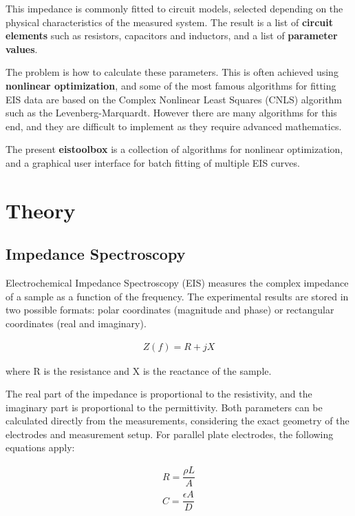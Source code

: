 \documentclass[10pt,a4paper,oneside]{book}
\begin{document}
This impedance is commonly fitted to circuit models, selected depending on the physical characteristics of the measured system. The result is a list of \textbf{circuit elements} such as resistors, capacitors and inductors, and a list of \textbf{parameter values}.

The problem is how to calculate these parameters. This is often achieved using \textbf{nonlinear optimization}, and some of the most famous algorithms for fitting EIS data are based on the Complex Nonlinear Least Squares (CNLS) algorithm such as the Levenberg-Marquardt. However there are many algorithms for this end, and they are difficult to implement as they require advanced mathematics.

The present \textbf{eistoolbox} is a collection of algorithms for nonlinear optimization, and a graphical user interface for batch fitting of multiple EIS curves.

\chapter{Theory}


\section{Impedance Spectroscopy}

Electrochemical Impedance Spectroscopy (EIS) measures the complex impedance of a sample as a function of the frequency. The experimental results are stored in two possible formats: polar coordinates (magnitude and phase) or rectangular coordinates (real and imaginary).

\begin{align} \label{impedance}
	Z(f) = R + jX
\end{align}

where R is the resistance and X is the reactance of the sample.

The real part of the impedance is proportional to the resistivity, and the imaginary part is proportional to the permittivity. Both parameters can be calculated directly from the measurements, considering the exact geometry of the electrodes and measurement setup. For parallel plate electrodes, the following equations apply:

\begin{align}
R = \dfrac{\rho L}{A} \label{resistance} \\
C = \dfrac{\epsilon A}{D} \label{capacitance}
\end{align}
\end{document}
